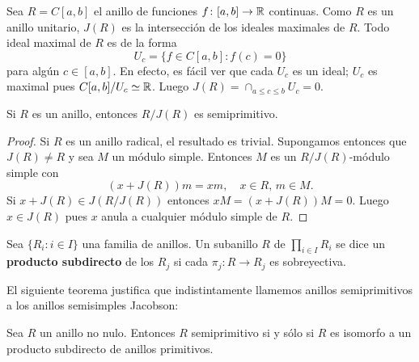 \begin{example}
	Sea $R=C[a,b]$ el anillo de funciones $f\colon [a,b]\to\mathbb{R}$ continuas. Como
	$R$ es un anillo unitario, $J(R)$ es la intersección de los ideales
	maximales de $R$. Todo ideal maximal de $R$ es de la forma
	\[
		U_c=\{f\in C[a,b]:f(c)=0\}
	\]
	para algún $c\in[a,b]$. En efecto, es fácil ver que cada $U_c$ es un ideal;
	$U_c$ es maximal pues $C[a,b]/U_c\simeq\mathbb{R}$.  Luego $J(R)=\cap_{a\leq c\leq
	b}U_c=0$.
\end{example}

\begin{theorem}
	\label{thm:semiprimitivo}
	Si $R$ es un anillo, entonces $R/J(R)$ es semiprimitivo. 
\end{theorem}

\begin{proof}
	Si $R$ es un anillo radical, el resultado es trivial. Supongamos entonces
	que $J(R)\ne R$ y sea $M$ un módulo simple. Entonces $M$ es un
	$R/J(R)$-módulo simple con
	\[
		(x+J(R))m=xm,\quad
		x\in R,\,m\in M.
	\]
	Si $x+J(R)\in J(R/J(R))$ entonces $xM=(x+J(R))M=0$. Luego $x\in J(R)$ pues
	$x$ anula a cualquier módulo simple de $R$.
\end{proof}

%
%


\begin{definition}
	Sea $\{R_i:i\in I\}$ una familia de anillos. Un subanillo $R$ de
	$\prod_{i\in I}R_i$ se dice un \textbf{producto subdirecto} de los $R_j$ si
	cada $\pi_j\colon R\to R_j$ es sobreyectiva. 
\end{definition}

El siguiente teorema justifica que indistintamente llamemos anillos
semiprimitivos a los anillos semisimples Jacobson:

\begin{theorem}
	\label{thm:subdirecto}
	Sea $R$ un anillo no nulo. Entonces $R$ semiprimitivo si y sólo si $R$ es
	isomorfo a un producto subdirecto de anillos primitivos.
\end{theorem}


